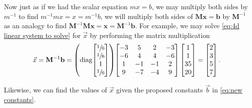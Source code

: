\documentclass{article}
\begin{document}
Now just as if we had the scalar equation $mx = b$, we may multiply both sides by $m^{-1}$ to find $m^{-1}mx = x = m^{-1}b$, we will multiply both sides of $\mathbf{M}\mathbf{x} = \mathbf{b}$ by $\mathbf{M}^{-1}$ as an analogy to find $\mathbf{M}^{-1}\mathbf{M}\mathbf{x} = \mathbf{x} = \mathbf{M}^{-1}\mathbf{b}$.
For example, we may solve \eqref{eq:4d linear system to solve} for $\vec{x}$ by performing the matrix multiplication
\begin{equation}\label{eq:inversion multiplication}
    \vec{x} = \mathbf{M}^{-1}\mathbf{b} = \left(
        \operatorname{diag}\!\left[
            \begin{matrix}
                \sfrac16 \\* \sfrac16 \\* 1 \\* \sfrac16 \\*
            \end{matrix}
        \right]
    \right)\!\left[
        \begin{matrix}
            { -3} & {  5} & { 2} & {-3} \\*
            { -6} & {  4} & { 4} & {-6} \\*
            {  1} &   -1  &  -1  &   2  \\*
            {  9} & {-7} & {-4} & { 9} \\*
        \end{matrix}
    \right]\left[
        \begin{matrix}
            1 \\* 1 \\* 35 \\* 20 \\*
        \end{matrix}
    \right] = \left[
        \begin{matrix}
            2 \\* 3 \\* 5 \\* 7 \\*
        \end{matrix}
    \right].
\end{equation}

Likewise, we can find the values of $\vec{x}$ given the proposed constants $\vec{b}$ in \eqref{eq:new constants}.
\end{document}
